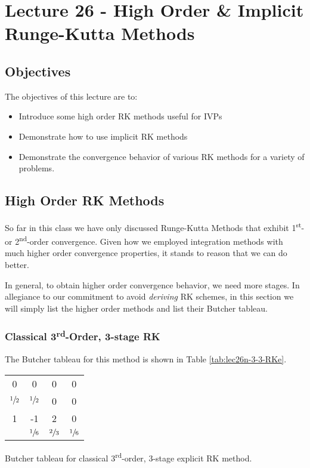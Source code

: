 \chapter{Lecture 26 - High Order \& Implicit Runge-Kutta Methods}
\label{ch:lec26n}
\section{Objectives}
The objectives of this lecture are to:
\begin{itemize}
\item Introduce some high order RK methods useful for IVPs
\item Demonstrate how to use implicit RK methods
\item Demonstrate the convergence behavior of various RK methods for a variety of problems.
\end{itemize}
\setcounter{lstannotation}{0}

\section{High Order RK Methods}
So far in this class we have only discussed Runge-Kutta Methods that exhibit 1\textsuperscript{st}- or 2\textsuperscript{nd}-order convergence.  Given how we employed integration methods with much higher order convergence properties, it stands to reason that we can do better.

In general, to obtain higher order convergence behavior, we need more stages.  In allegiance to our commitment to avoid \emph{deriving} RK schemes, in this section we will simply list the higher order methods and list their Butcher tableau.

\subsection{Classical 3\textsuperscript{rd}-Order, 3-stage RK}
The Butcher tableau for this method is shown in Table \ref{tab:lec26n-3-3-RKe}.
\begin{margintable}
\begin{tabular}{c|ccc}
0 & 0 & 0 & 0 \\
$\sfrac{1}{2}$ & $\sfrac{1}{2}$ & 0 & 0 \\
1 & -1 & 2 & 0 \\ \hline
  & $\sfrac{1}{6}$ & $\sfrac{2}{3}$ & $\sfrac{1}{6}$ \\
\end{tabular}
\caption{Butcher tableau for classical 3\textsuperscript{rd}-order, 3-stage explicit RK method.}
\label{tab:lec26n-3-3-RKe}
\end{margintable}

